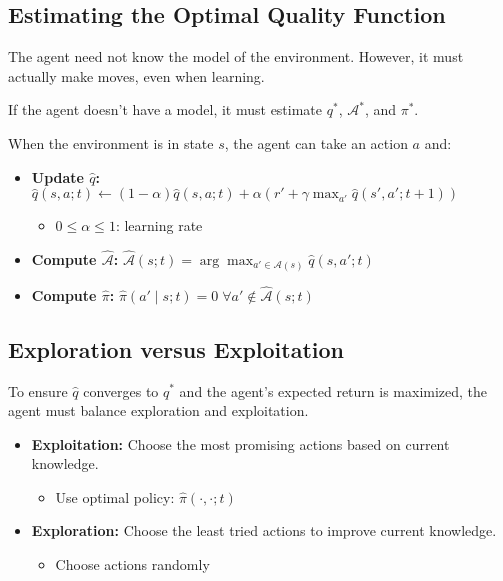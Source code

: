 \subsection{Estimating the Optimal Quality Function}
\begin{motivation}
    The agent need not know the model of the environment. However, it must actually make moves, even when learning. 
    \vspace{1em}

    If the agent doesn't have a model, it must estimate $q^*$, $\mathcal{A}^*$, and $\pi^*$. 
\end{motivation}

\begin{definition}
    When the environment is in state $s$, the agent can take an action $a$ and: 
    \begin{itemize}
        \item \textbf{Update $\hat{q}$:} $\hat{q}(s,a; t) \leftarrow (1-\alpha) \hat{q}(s,a;t) + \alpha \left( r' + \gamma \max_{a'} \hat{q}(s',a';t+1) \right)$
        \begin{itemize}
            \item $0 \leq \alpha \leq 1$: learning rate
        \end{itemize}
        \item \textbf{Compute $\hat{\mathcal{A}}$:} $\hat{\mathcal{A}}(s;t) = \arg\max_{a'\in \mathcal{A}(s)} \hat{q}(s,a';t)$
        \item \textbf{Compute $\hat{\pi}$:} $\hat{\pi}(a' \mid s;t) = 0 \; \forall a' \notin \hat{\mathcal{A}}(s;t)$
    \end{itemize}
\end{definition}

\subsection{Exploration versus Exploitation}
\begin{motivation}
    To ensure $\hat{q}$ converges to $q^*$ and the agent's expected return is maximized, the agent must balance exploration and exploitation.    
\end{motivation}

\begin{definition}
    \begin{itemize}
        \item \textbf{Exploitation:} Choose the most promising actions based on current knowledge. 
        \begin{itemize}
            \item Use optimal policy: $\hat{\pi}(\cdot,\cdot;t)$
        \end{itemize}
        \item \textbf{Exploration:} Choose the least tried actions to improve current knowledge.
        \begin{itemize}
            \item Choose actions randomly 
        \end{itemize}
    \end{itemize}
\end{definition}

